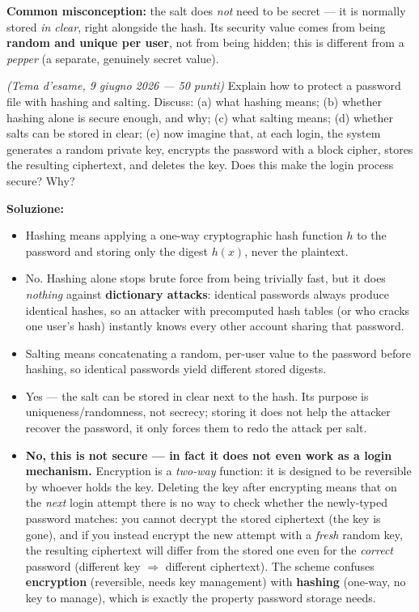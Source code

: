 \documentclass[12pt, a4paper]{article}
\newcounter{esercizio}[section]
\begin{document}
\textcolor{ForestGreen!60!black}{\textbf{Common misconception:}} the salt does \emph{not} need to be secret — it is normally stored \emph{in clear}, right alongside the hash. Its security value comes from being \textbf{random and unique per user}, not from being hidden; this is different from a \emph{pepper} (a separate, genuinely secret value).

\begin{tcolorbox}[colback=lightergray!10, colframe=tocsec, title=\textbf{Esercizio \theesercizio}]
\textit{(Tema d'esame, 9 giugno 2026 — 50 punti)} Explain how to protect a password file with hashing and salting. Discuss: (a) what hashing means; (b) whether hashing alone is secure enough, and why; (c) what salting means; (d) whether salts can be stored in clear; (e) now imagine that, at each login, the system generates a random private key, encrypts the password with a block cipher, stores the resulting ciphertext, and deletes the key. Does this make the login process secure? Why?
\end{tcolorbox}

\textbf{Soluzione:}
\begin{itemize}
    \item[(a)] Hashing means applying a one-way cryptographic hash function $h$ to the password and storing only the digest $h(x)$, never the plaintext.
    \item[(b)] No. Hashing alone stops brute force from being trivially fast, but it does \emph{nothing} against \textbf{dictionary attacks}: identical passwords always produce identical hashes, so an attacker with precomputed hash tables (or who cracks one user's hash) instantly knows every other account sharing that password.
    \item[(c)] Salting means concatenating a random, per-user value to the password before hashing, so identical passwords yield different stored digests.
    \item[(d)] Yes — the salt can be stored in clear next to the hash. Its purpose is uniqueness/randomness, not secrecy; storing it does not help the attacker recover the password, it only forces them to redo the attack per salt.
    \item[(e)] \textbf{No, this is not secure — in fact it does not even work as a login mechanism.} Encryption is a \emph{two-way} function: it is designed to be reversible by whoever holds the key. Deleting the key after encrypting means that on the \emph{next} login attempt there is no way to check whether the newly-typed password matches: you cannot decrypt the stored ciphertext (the key is gone), and if you instead encrypt the new attempt with a \emph{fresh} random key, the resulting ciphertext will differ from the stored one even for the \emph{correct} password (different key $\Rightarrow$ different ciphertext). The scheme confuses \textbf{encryption} (reversible, needs key management) with \textbf{hashing} (one-way, no key to manage), which is exactly the property password storage needs.
\end{itemize}
\end{document}

